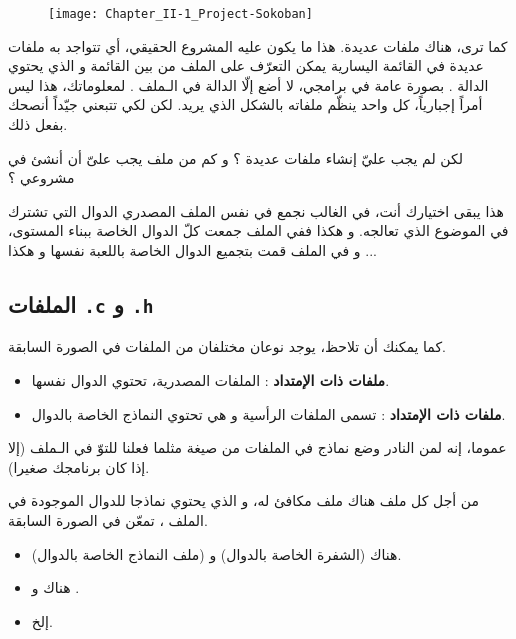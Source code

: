 \begin{figure}[H]
	\centering
	\texttt{[image: Chapter\_II-1\_Project-Sokoban]}
\end{figure}

كما ترى، هناك ملفات عديدة. هذا ما يكون عليه المشروع الحقيقي، أي تتواجد به ملفات عديدة في القائمة اليسارية  يمكن التعرّف على الملف
من بين القائمة و الذي يحتوي الدالة
.
بصورة عامة في برامجي، لا أضع إلّا الدالة
في الـملف
.
لمعلوماتك، هذا ليس أمراً إجبارياً، كل واحد ينظّم ملفاته بالشكل الذي يريد. لكن لكي تتبعني جيّداً أنصحك بفعل ذلك.

\begin{question}
  لكن لم يجب عليّ إنشاء ملفات عديدة ؟ و كم من ملف يجب علىّ أن أنشئ في مشروعي ؟
\end{question}

هذا يبقى اختيارك أنت، في الغالب نجمع في نفس الملف المصدري الدوال التي تشترك في الموضوع الذي تعالجه. و هكذا ففي الملف
جمعت كلّ الدوال الخاصة ببناء المستوى، و في الملف
قمت بتجميع الدوال الخاصة باللعبة نفسها و هكذا ...

\subsection{الملفات \texttt{.c} و \texttt{.h}}

كما يمكنك أن تلاحظ، يوجد نوعان مختلفان من الملفات في الصورة السابقة.

\begin{itemize}
  \item \textbf{ملفات ذات الإمتداد
}
: الملفات المصدرية، تحتوي الدوال نفسها.
  \item \textbf{ملفات ذات الإمتداد
}
: تسمى الملفات الرأسية و هي تحتوي النماذج الخاصة بالدوال.
\end{itemize}

عموما، إنه لمن النادر وضع نماذج في الملفات من صيغة
مثلما فعلنا للتوّ في الـملف
(إلا إذا كان برنامجك صغيرا).

من أجل كل ملف
هناك ملف مكافئ له، و الذي يحتوي نماذجا للدوال الموجودة في الملف
،
تمعّن في الصورة السابقة.

\begin{itemize}
  \item هناك
(الشفرة الخاصة بالدوال) و
(ملف النماذج الخاصة بالدوال).
  \item هناك
و
.
  \item إلخ.
\end{itemize}

